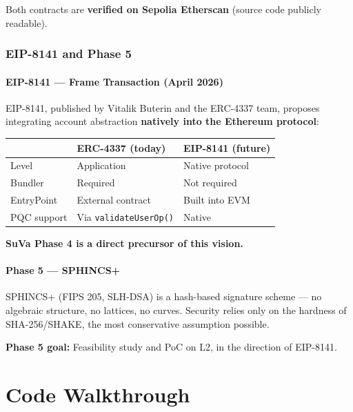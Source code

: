 \documentclass[11pt,a4paper]{article}
\begin{document}
Both contracts are \textbf{verified on Sepolia Etherscan} (source code publicly readable).

\section{EIP-8141 and Phase 5}

\subsection{EIP-8141 --- Frame Transaction (April 2026)}

EIP-8141, published by Vitalik Buterin and the ERC-4337 team, proposes integrating account abstraction \textbf{natively into the Ethereum protocol}:

\begin{center}
\begin{tabular}{lll}
\toprule
& \textbf{ERC-4337 (today)} & \textbf{EIP-8141 (future)} \\
\midrule
Level & Application & Native protocol \\
Bundler & Required & Not required \\
EntryPoint & External contract & Built into EVM \\
PQC support & Via \texttt{validateUserOp()} & Native \\
\bottomrule
\end{tabular}
\end{center}

\textbf{SuVa Phase 4 is a direct precursor of this vision.}

\subsection{Phase 5 --- SPHINCS+}

SPHINCS+ (FIPS 205, SLH-DSA) is a hash-based signature scheme --- no algebraic structure, no lattices, no curves. Security relies only on the hardness of SHA-256/SHAKE, the most conservative assumption possible.

\textbf{Phase 5 goal:} Feasibility study and PoC on L2, in the direction of EIP-8141.

\newpage
\part{Code Walkthrough}
\end{document}
